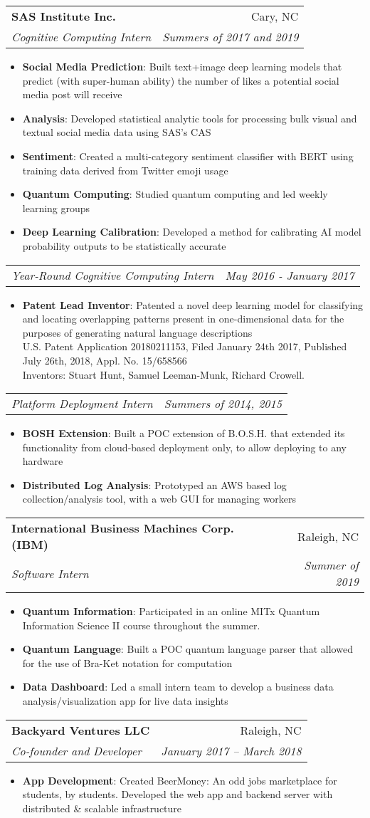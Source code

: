 \documentclass[letterpaper,10pt]{article}
\makeatletter
\newcommand{\resumeItem}[2]{
  \item\small{
    \textbf{#1}{: #2 \vspace{-2pt}}
  }
}
\newcommand{\resumeSubheading}[4]{
  \vspace{-1pt}\item
    \begin{tabular*}{0.97\textwidth}{l@{\extracolsep{\fill}}r}
      \textbf{#1} & #2 \\
      \textit{\small#3} & \textit{\small #4} \\
    \end{tabular*}\vspace{-5pt}
}
\newcommand{\resumeSubheadingPartial}[2]{
  \vspace{-1pt}
    \begin{tabular*}{0.97\textwidth}{l@{\extracolsep{\fill}}r}
      \textit{\small#1} & \textit{\small #2} \\
    \end{tabular*}\vspace{-5pt}
}
\newcommand{\resumeItemListStart}{\begin{itemize}}
\newcommand{\resumeItemListEnd}{\end{itemize}\vspace{-5pt}}
\makeatother
\begin{document}
\resumeSubheading
{SAS Institute Inc.}{Cary, NC}
{Cognitive Computing Intern}{Summers of 2017 and 2019}
\resumeItemListStart
\resumeItem{Social Media Prediction}
{Built text+image deep learning models that predict (with super-human ability) the number of likes a potential social media post will receive}
\resumeItem{Analysis}{Developed statistical analytic tools for processing bulk visual and textual social media data using SAS's CAS}
\resumeItem{Sentiment}{Created a multi-category sentiment classifier with BERT using training data derived from Twitter emoji usage}
\resumeItem{Quantum Computing}{Studied quantum computing and led weekly learning groups}
\resumeItem{Deep Learning Calibration}{Developed a method for calibrating AI model probability outputs to be statistically accurate}
\resumeItemListEnd
\resumeSubheadingPartial{Year-Round Cognitive Computing Intern}{May 2016 - January 2017}
\resumeItemListStart
\resumeItem{Patent Lead Inventor}{Patented a novel deep learning model for classifying and locating overlapping patterns present in one-dimensional data for the purposes of generating natural language descriptions\\U.S. Patent Application 20180211153, Filed January 24th 2017, Published July 26th, 2018, Appl. No. 15/658566\\Inventors: Stuart Hunt, Samuel Leeman-Munk, Richard Crowell.}
\resumeItemListEnd
\resumeSubheadingPartial{Platform Deployment Intern}{Summers of 2014, 2015}
\resumeItemListStart
\resumeItem{BOSH Extension}{Built a POC extension of B.O.S.H. that extended its functionality from cloud-based deployment only, to allow deploying to any hardware}
\resumeItem{Distributed Log Analysis}{Prototyped an AWS based log collection/analysis tool, with a web GUI for managing workers}
\resumeItemListEnd

\resumeSubheading
{International Business Machines Corp. (IBM)}{Raleigh, NC}
{Software Intern}{Summer of 2019}
\resumeItemListStart
\resumeItem{Quantum Information}
{Participated in an online MITx Quantum Information Science II course throughout the summer.}
\resumeItem{Quantum Language}
{Built a POC quantum language parser that allowed for the use of Bra-Ket notation for computation}
\resumeItem{Data Dashboard}
{Led a small intern team to develop a business data analysis/visualization app for live data insights}
\resumeItemListEnd

\resumeSubheading
{Backyard Ventures LLC}{Raleigh, NC}
{Co-founder and Developer}{January 2017 – March 2018}
\resumeItemListStart
\resumeItem{App Development}{Created BeerMoney: An odd jobs marketplace for students, by students. Developed the web app and backend server with distributed \& scalable infrastructure}
\resumeItemListEnd
\end{document}
